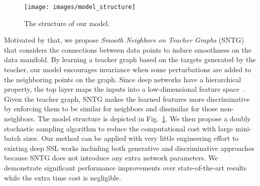 \documentclass[10pt,twocolumn,letterpaper]{article}
\begin{document}

\begin{figure}[t]
	\centering\vspace{-1.48cm}
	\texttt{[image: images/model\_structure]}\vspace{-1.6cm}
	\caption{The structure of our model.}\vspace{-.6cm}
	\label{fig:modelstructure}
\end{figure}

Motivated by that, we propose \emph{Smooth Neighbors on Teacher Graphs} (SNTG) that considers the connections between data points to induce smoothness on the data manifold.
By learning a teacher graph based on the targets generated by the teacher,
our model encourages invariance when some perturbations are added to the neighboring points on the graph.
Since deep networks have a hierarchical property, the top layer maps the inputs into a low-dimensional feature space~\cite{bengio2009learning,sharif2014cnn,NIPS2016_6263}. Given the teacher graph, SNTG makes the learned features more discriminative by enforcing them to be similar for neighbors and dissimilar for those non-neighbors. The model structure is depicted in Fig.~\ref{fig:modelstructure}. We then propose a doubly stochastic sampling algorithm to reduce the computational cost with large mini-batch sizes. Our method can be applied with very little engineering effort to existing deep SSL works including both generative and discriminative approaches because SNTG does not introduce any extra network parameters. We demonstrate significant performance improvements over state-of-the-art results while the extra time cost is negligible.%
\end{document}

